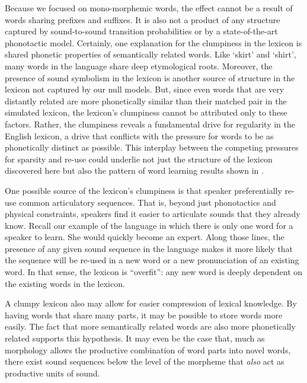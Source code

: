 \documentclass{article}
\begin{document}
Because we focused on mono-morphemic words, the effect cannot be a result of words sharing prefixes and
suffixes. It is also not a product of any structure captured by sound-to-sound transition probabilities or by
a state-of-the-art phonotactic model. Certainly, one explanation for the clumpiness in the lexicon is shared
phonetic properties of semantically related words. Like `skirt' and `shirt', many words in the language share
deep etymological roots. Moreover, the presence of sound symbolism in the lexicon is another source of
structure in the lexicon not captured by our null models. But, since even words that are very distantly
related are more phonetically similar than their matched pair in the simulated lexicon, the lexicon's
clumpiness cannot be attributed only to these factors. Rather, the clumpiness reveals a fundamental drive for
regularity in the English lexicon, a drive that conflicts with the pressure for words to be as phonetically
distinct as possible. This interplay between the competing pressures for sparsity and re-use could underlie
not just the structure of the lexicon discovered here but also the pattern of word learning results shown in
\cite{storkel_differentiating_2006}.

One possible source of the lexicon's clumpiness is that speaker preferentially re-use common articulatory
sequences. That is, beyond just phonotactics and physical constraints, speakers find it easier to articulate
sounds that they already know. Recall our example of the language in which there is only one word for a
speaker to learn. She would quickly become an expert. Along those lines, the presence of any given sound
sequence in the language makes it more likely that the sequence will be re-used in a new word or a new
pronunciation of an existing word. In that sense, the lexicon is ``overfit'': any new word is deeply dependent
on the existing words in the lexicon.

A clumpy lexicon also may allow for easier compression of lexical knowledge. By having words that share many
parts, it may be possible to store words more easily. The fact that more semantically related words are also
more phonetically related supports this hypothesis. It may even be the case that, much as morphology allows
the productive combination of word parts into novel words, there exist sound sequences below the level of the
morpheme that \textit{also} act as productive units of sound.
\end{document}
